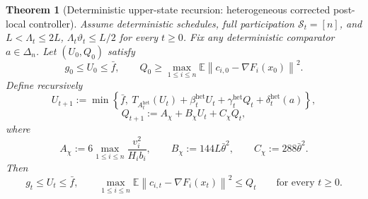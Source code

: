 \documentclass[10pt,a4paper]{amsart}
\newtheorem{theorem}{Theorem}
\newcommand{\EE}{\mathbb E}
\newcommand{\norm}[1]{\left\lVert #1\right\rVert}
\begin{document}
\begin{theorem}[Deterministic upper-state recursion: heterogeneous corrected post-local controller]
\label{th:realized-het-global}
Assume deterministic schedules, full participation $\mathcal S_t=[n]$, and $L<\Lambda_t\le 2L$, $\Lambda_t\vartheta_t\le L/2$ for every $t\ge 0$. Fix any deterministic comparator $a\in\Delta_n$. Let $(U_0,Q_0)$ satisfy
\begin{equation}
g_0\le U_0\le \bar f,
\qquad
Q_0\ge \max_{1\le i\le n}\EE\norm{c_{i,0}-\nabla F_i(x_0)}^2.
\label{eq:realized-het-init}\end{equation}
Define recursively
\begin{equation}
U_{t+1}
:=
\min\!\left\{
\bar f,\
T_{A_t^{\mathrm{het}}}(U_t)
+
\beta_t^{\mathrm{het}}U_t
+
\gamma_t^{\mathrm{het}}Q_t
+
\delta_t^{\mathrm{het}}(a)
\right\},
\label{eq:realized-het-U}\end{equation}
\begin{equation}
Q_{t+1}
:=
A_\chi+B_\chi U_t+C_\chi Q_t,
\label{eq:realized-het-Q}\end{equation}
where
\begin{equation}
A_\chi:=6\max_{1\le i\le n}\frac{v_i^2}{H_i b_i},
\qquad
B_\chi:=144L\bar\theta^2,
\qquad
C_\chi:=288\bar\theta^2.
\label{eq:realized-het-tracking-coeff}\end{equation}
Then
\begin{equation}
g_t\le U_t\le \bar f,
\qquad
\max_{1\le i\le n}\EE\norm{c_{i,t}-\nabla F_i(x_t)}^2\le Q_t
\qquad
\text{for every }t\ge 0.
\label{eq:realized-het-upper-state}\end{equation}
\end{theorem}
\end{document}
